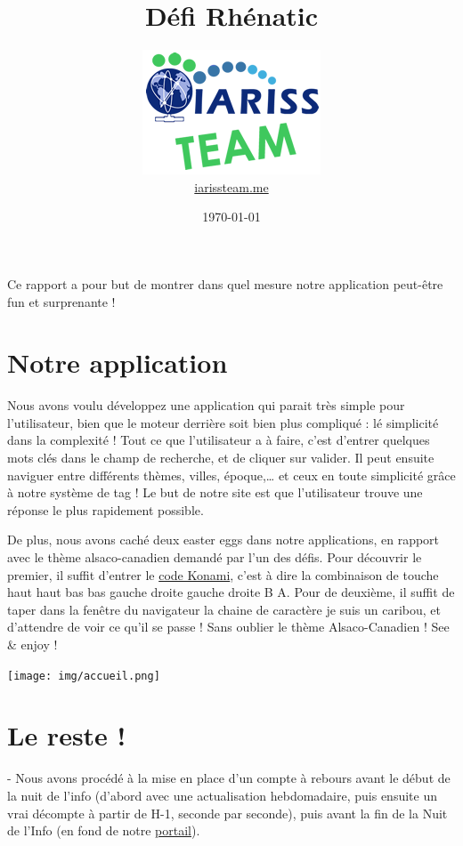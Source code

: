 \documentclass[12pt, a4paper]{article}
\title{Défi Rhénatic}
\newcommand{\espace}{\vspace{.8cm}}
\begin{document}
\author{\includegraphics{../_img/iariss_team.png} \\ {\sffamily \href{http://iarissteam.me}{iarissteam.me}}}
\date{\today}

\maketitle{}

{\sffamily Ce rapport a pour but de montrer dans quel mesure notre application peut-être fun et surprenante !} 

\espace{}
\section*{Notre application}
Nous avons voulu développez une application qui parait très simple pour l'utilisateur, bien que le moteur derrière soit bien plus compliqué : lé simplicité dans la complexité ! Tout ce que l'utilisateur a à faire, c'est d'entrer quelques mots clés dans le champ de recherche, et de cliquer sur valider. Il peut ensuite naviguer entre différents thèmes, villes, époque,\ldots{} et ceux en toute simplicité grâce à notre système de tag ! Le but de notre site est que l'utilisateur trouve une réponse le plus rapidement possible.

De plus, nous avons caché deux easter eggs dans notre applications, en rapport avec le thème alsaco-canadien demandé par l'un des défis.
Pour découvrir le premier, il suffit d'entrer le \href{http://fr.wikipedia.org/wiki/Code_Konami}{code Konami}, c'est à dire la combinaison de touche haut haut bas bas gauche droite gauche droite B A.
Pour de deuxième, il suffit de taper dans la fenêtre du navigateur la chaine de caractère \og{}je suis un caribou\fg{}, et d'attendre de voir ce qu'il se passe !
Sans oublier le thème Alsaco-Canadien !
See & enjoy !
\espace{}
\begin{center}
\texttt{[image: img/accueil.png]}
\end{center}
\espace{}

\section*{Le reste !}
- Nous avons procédé à la mise en place d'un compte à rebours avant le début de la nuit de l'info (d'abord avec une actualisation hebdomadaire, puis ensuite un vrai décompte à partir de H-1, seconde par seconde), puis avant la fin de la Nuit de l'Info (en fond de notre \href{http://iarissteam.me/}{portail}).
\end{document}

